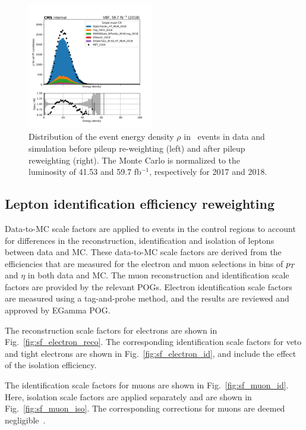 \begin{figure}[ht!]
\begin{center}
    \includegraphics[width=0.49\textwidth]{Pileup/cr_1m_vbf_rho_all_2018.pdf}
    \caption{
        Distribution of the event energy density $\rho$ in \Wmn~events in data and
        simulation before pileup re-weighting (left) and after pileup reweighting (right).
        The Monte Carlo is normalized to the luminosity of 41.53 and 59.7 fb$^{-1}$, respectively for 2017 and 2018.
    }
    \label{fig:purwt_rho}
  \end{center}
\end{figure}

\clearpage

\subsection{Lepton identification efficiency reweighting}
\label{subsec:lepton_id_reweighting}

Data-to-MC scale factors are applied to events in the control regions to
account for differences in the reconstruction, identification and isolation of leptons
between data and MC. These data-to-MC scale factors are derived from the efficiencies that are measured for the electron and muon
selections in bins of $p_T$ and $\eta$ in both data and MC. The muon reconstruction and identification scale factors are
provided by the relevant POGs. Electron identification scale factors are measured using a tag-and-probe method, and the results are reviewed 
and approved by EGamma POG.

The reconstruction scale factors for electrons are shown in Fig.~\ref{fig:sf_electron_reco}. The corresponding identification scale factors for 
veto and tight electrons are shown in Fig.~\ref{fig:sf_electron_id}, and include the effect of the isolation efficiency. 

The identification scale factors for muons are shown in Fig.~\ref{fig:sf_muon_id}. Here, isolation scale factors are applied separately and are 
shown in Fig.~\ref{fig:sf_muon_iso}. The corresponding corrections for muons are deemed negligible~\cite{CMS-MUO-TWIKI-SF}.

